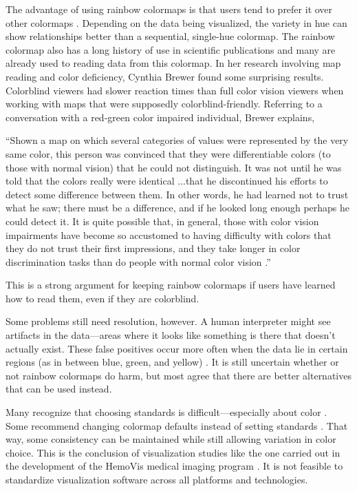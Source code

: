 \documentclass[journal,12pt]{IEEEtran}
\begin{document}
The advantage of using rainbow colormaps is that users tend to prefer it
over other colormaps \cite{spectralschemes, choropleth, endofrainbow}. 
Depending on the data being visualized, the variety in hue can show relationships better than
a sequential, single-hue colormap. The rainbow colormap also has a long
history of use in scientific publications and many are already used
to reading data from this colormap. In her research involving map reading and color deficiency,
Cynthia Brewer found some surprising results. Colorblind viewers had slower reaction times than 
full color vision viewers
when working with maps that were supposedly colorblind-friendly.
Referring to a conversation
with a red-green color impaired individual, Brewer explains,
\begin{displayquote}
``Shown a map on which several categories of values were represented by the very same color,
this person was convinced that they were differentiable colors (to those with normal vision) that 
he could not distinguish. It was not until he was told that the colors really were identical
...that he discontinued his efforts to detect some difference between them. In other words,
he had learned not to trust what he saw; there must be a difference, and if he looked long enough
perhaps he could detect it. It is quite possible that, in general, those with color vision impairments
have become so accustomed to having difficulty with colors that they do not trust their first impressions, and
they take longer in color discrimination tasks than do people with normal color vision \cite{mapcvi}.''
\end{displayquote}
This is a strong argument for keeping rainbow colormaps if users have learned how to read them,
even if they are colorblind.

Some problems still need resolution, however.
A human interpreter might see artifacts in the data---areas where it looks like
something is there that doesn't actually exist. These false positives
 occur more often when the data lie in certain regions (as in
between blue, green, and yellow) \cite{colorchoice, endofrainbow,oceanography}.
It is still uncertain whether or not rainbow colormaps do harm, but most agree
that there are better alternatives that can be used instead.

Many recognize that choosing standards is difficult---especially about color \cite{standardmedimg}. 
Some recommend changing 
colormap defaults instead of setting standards \cite{viridis,matlab}. That way, some 
consistency can be maintained while still allowing variation in color choice.
This is the conclusion of visualization studies like the one 
carried out in the development of the HemoVis medical imaging program 
\cite{arteryvis}. It is not feasible to standardize visualization
software across all platforms and technologies.
\end{document}
